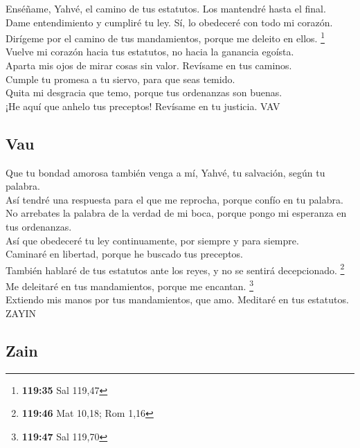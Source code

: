  Enséñame, Yahvé, el camino de tus estatutos. Los
mantendré hasta el final.\\
 Dame entendimiento y cumpliré tu ley. Sí, lo obedeceré
con todo mi corazón.\\
 Dirígeme por el camino de tus mandamientos, porque me
deleito en ellos. \footnote{\textbf{119:35} Sal 119,47}\\
 Vuelve mi corazón hacia tus estatutos, no hacia la
ganancia egoísta.\\
 Aparta mis ojos de mirar cosas sin valor. Revísame en
tus caminos.\\
 Cumple tu promesa a tu siervo, para que seas temido.\\
 Quita mi desgracia que temo, porque tus ordenanzas son
buenas.\\
 ¡He aquí que anhelo tus preceptos! Revísame en tu
justicia. VAV

\hypertarget{vau}{%
\subsection{Vau}\label{vau}}

 Que tu bondad amorosa también venga a mí, Yahvé, tu
salvación, según tu palabra.\\
 Así tendré una respuesta para el que me reprocha, porque
confío en tu palabra.\\
 No arrebates la palabra de la verdad de mi boca, porque
pongo mi esperanza en tus ordenanzas.\\
 Así que obedeceré tu ley continuamente, por siempre y
para siempre.\\
 Caminaré en libertad, porque he buscado tus preceptos.\\
 También hablaré de tus estatutos ante los reyes, y no se
sentirá decepcionado. \footnote{\textbf{119:46} Mat 10,18; Rom 1,16}\\
 Me deleitaré en tus mandamientos, porque me encantan.
\footnote{\textbf{119:47} Sal 119,70}\\
 Extiendo mis manos por tus mandamientos, que amo.
Meditaré en tus estatutos. ZAYIN

\hypertarget{zain}{%
\subsection{Zain}\label{zain}}


